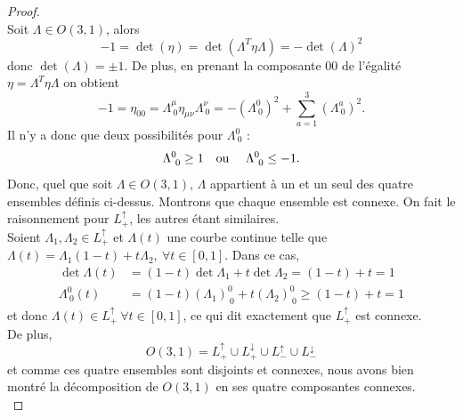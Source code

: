 \documentclass[a4paper,11pt]{report}
\begin{document}
            \begin{proof}
            ${}$\\
                Soit $\Lambda\in O(3,1)$, alors
                \begin{equation}
                    -1 = \det(\eta) = \det(\Lambda^T\eta\Lambda) = -\det(\Lambda)^2
                \end{equation}
                donc $\det(\Lambda) = \pm 1$. De plus, en prenant la composante $00$ de l'égalité $\eta = \Lambda^T\eta\Lambda$ on obtient
                \begin{equation}
                    -1 = \eta_{00} = \Lambda^\mu_{~0}\eta_{\mu\nu}\Lambda^\nu_{~0} = -(\Lambda^0_{~0})^2+\sum_{a=1}^3(\Lambda^a_{~0})^2.
                \end{equation}
                Il n'y a donc que deux possibilités pour $\Lambda^0_{~0}$ :
                \begin{equation}
                    \Lambda^0_{~0} \geq 1 \text{\quad ou \quad} \Lambda^0_{~0} \leq -1.
                \end{equation}
                Donc, quel que soit $\Lambda\in O(3,1)$, $\Lambda$ appartient à un et un seul des quatre ensembles définis ci-dessus. Montrons que chaque ensemble est connexe. On fait le raisonnement pour $L_+^\uparrow$, les autres étant similaires.\\
                Soient $\Lambda_1, \Lambda_2 \in L_+^\uparrow$ et $\Lambda(t)$ une courbe continue telle que $\Lambda(t) = \Lambda_1 (1 - t) + t\Lambda_2, ~\forall t \in [0,1]$. Dans ce cas, 
                \begin{align}
                    \det \Lambda(t) &= (1 - t)\det \Lambda_1 + t \det \Lambda_2 = (1 - t) + t = 1\\
                    \Lambda^0_{~0}(t) &= (1 - t)(\Lambda_1)^{0}_{~0} + t(\Lambda_2)^{0}_{~0} \ge (1 - t) + t = 1
                \end{align}
                et donc $\Lambda(t) \in L_+^\uparrow~\forall t \in [0,1]$, ce qui dit exactement que $L_+^\uparrow$ est connexe. \\
                De plus,  
                \begin{equation}
                    O(3, 1) = L_+^\uparrow \cup L_+^\downarrow \cup L_-^\uparrow \cup L_-^\downarrow 
                \end{equation}
                et comme ces quatre ensembles sont disjoints et connexes, nous avons bien montré la décomposition de $O(3, 1)$ en ses quatre composantes connexes.\\

\end{proof}
\end{document}
